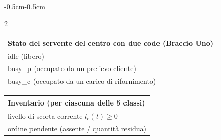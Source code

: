 \documentclass{article}
\begin{document}
\begin{adjustwidth}{-0.5cm}{-0.5cm}
\begin{multicols}{2}
\begin{minipage}{\linewidth}
\centering
\begin{tabularx}{\linewidth}{|X|}
  \hline
  \textbf{Stato del servente del centro con due code (Braccio Uno)} \\
  \hline
   idle (libero)\\
  \hline
   busy\_p (occupato da un prelievo cliente)\\
  \hline
   busy\_c (occupato da un carico di rifornimento)\\
  \hline
\end{tabularx}
\end{minipage}

\begin{minipage}{\linewidth}
\centering
\begin{tabularx}{\linewidth}{|X|}
  \hline
  \textbf{Inventario (per ciascuna delle 5 classi)} \\
  \hline
   livello di scorta corrente $l_c(t) \ge 0$\\
  \hline
   ordine pendente (assente / quantità residua)\\
  \hline
\end{tabularx}
\end{minipage}

\end{multicols}


\end{adjustwidth}
\end{document}

